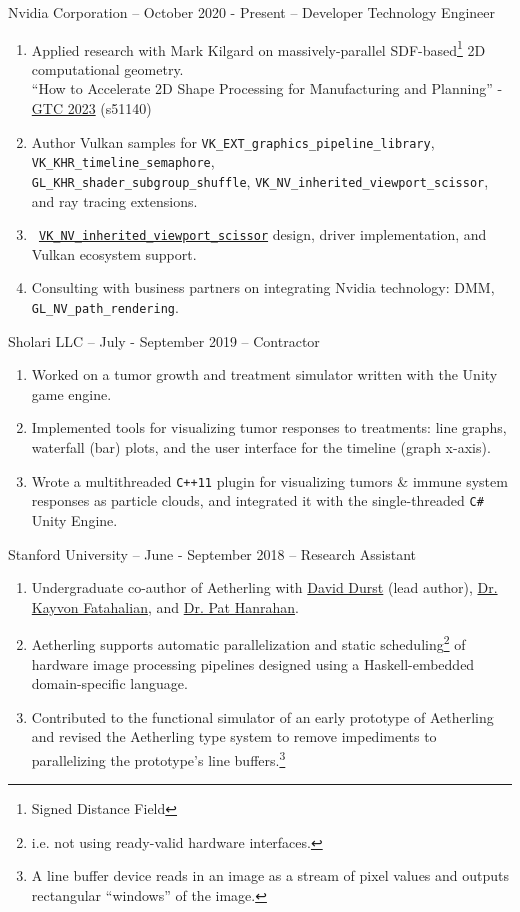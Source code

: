 \documentclass[11pt]{article}
\newcommand{\webText}[2]{{\color{webColor} \href{#1}{#2}}}
\newcommand{\mySub}[1]{{\color{subColor}\hspace{-6mm} \textsf{#1}}}
\newcommand{\lighttt}[1]{{\color{lightttColor}\texttt{#1}}}
\begin{document}
\mySub{Nvidia Corporation -- October 2020 - Present -- Developer Technology Engineer}
\begin{enumerate}
\item Applied research with Mark Kilgard on
  massively-parallel SDF-based\footnote{Signed Distance Field} 2D
  computational geometry.\\
  ``How to Accelerate 2D Shape Processing for Manufacturing and Planning''
  - \webText{https://www.nvidia.com/en-us/on-demand/session/gtcspring23-s51140/}{GTC 2023}
  (s51140)

\item Author Vulkan samples for
  \lighttt{VK\_EXT\_graphics\_pipeline\_library},
  \lighttt{VK\_KHR\_timeline\_semaphore},\\
  \lighttt{GL\_KHR\_shader\_subgroup\_shuffle},
  \lighttt{VK\_NV\_inherited\_viewport\_scissor}, and ray tracing extensions.

\item
  \texttt{\webText{https://registry.khronos.org/vulkan/specs/1.3-extensions/man/html/VK_NV_inherited_viewport_scissor.html}{VK\_NV\_inherited\_viewport\_scissor}}
  design, driver implementation, and Vulkan ecosystem support.

\item Consulting with business partners on integrating Nvidia
  technology: DMM, \lighttt{GL\_NV\_path\_rendering}.
\end{enumerate}
\filbreak
\mySub{Sholari LLC -- July - September 2019 -- Contractor}
\begin{enumerate}
\item Worked on a tumor growth and treatment simulator written with
  the Unity game engine.
\item Implemented tools for visualizing tumor responses to treatments:
  line graphs, waterfall (bar) plots, and the user interface for the
  timeline (graph x-axis).
\item Wrote a multithreaded \lighttt{C++11} plugin for visualizing
  tumors \& immune system responses as particle clouds, and integrated
  it with the single-threaded \lighttt{C\#} Unity Engine.
\end{enumerate}
\filbreak
\mySub{Stanford University -- June - September 2018 --
  Research Assistant}
\begin{enumerate}
\item Undergraduate co-author of Aetherling with
  \webText{https://david-durst.github.io/}{David Durst} (lead author),
  \webText{https://graphics.stanford.edu/~kayvonf/}{Dr. Kayvon Fatahalian},
  and \webText{https://graphics.stanford.edu/~hanrahan/}{Dr. Pat Hanrahan}.
\item Aetherling supports automatic parallelization and static
  scheduling\footnote{i.e. not using ready-valid hardware interfaces.}
  of hardware image processing pipelines designed using a
  Haskell-embedded domain-specific language.
\item Contributed to the functional simulator of an early prototype of
  Aetherling and revised the Aetherling type system to remove
  impediments to parallelizing the prototype's line
  buffers.\footnote{A line buffer device reads in an image as a stream
    of pixel values and outputs rectangular ``windows'' of
    the image.}
\end{enumerate}
\end{document}
